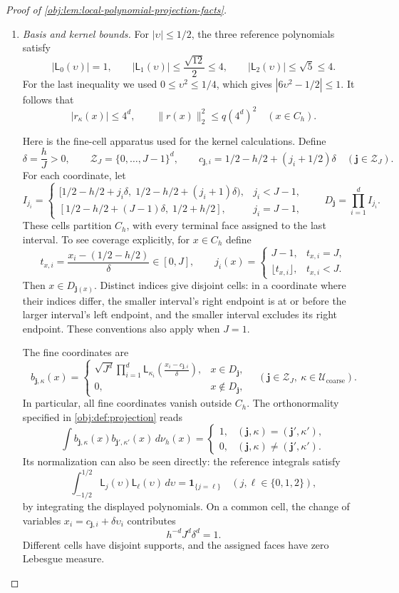 \begin{proof}[Proof of \cref{obj:lem:local-polynomial-projection-facts}]
\begin{enumerate}
\item \emph{Basis and kernel bounds.}
For \(|\upsilon|\le1/2\), the three reference polynomials satisfy
\[
|\mathsf L_0(\upsilon)|=1,\qquad
|\mathsf L_1(\upsilon)|\le\frac{\sqrt{12}}2\le4,\qquad
|\mathsf L_2(\upsilon)|\le\sqrt5\le4.
\]
For the last inequality we used
\(0\le\upsilon^2\le1/4\), which gives
\(|6\upsilon^2-1/2|\le1\). It follows that
\[
|r_\kappa(x)|\le4^d,
\qquad
\|r(x)\|_2^2\le q(4^d)^2
\quad(x\in C_h).
\]

Here is the fine-cell apparatus used for the kernel calculations.
Define
\[
\delta=\frac hJ>0,\qquad
\mathcal Z_J=\{0,\ldots,J-1\}^d,
\qquad
c_{\mathbf j,i}=1/2-h/2+(j_i+1/2)\delta
\quad(\mathbf j\in\mathcal Z_J).
\]
For each coordinate, let
\[
I_{j_i}=
\begin{cases}
[1/2-h/2+j_i\delta,\;1/2-h/2+(j_i+1)\delta),
 &j_i<J-1,\\
[1/2-h/2+(J-1)\delta,\;1/2+h/2],
 &j_i=J-1,
\end{cases}
\qquad
D_{\mathbf j}=\prod_{i=1}^d I_{j_i}.
\]
These cells partition \(C_h\), with every terminal face assigned to the
last interval. To see coverage explicitly, for \(x\in C_h\) define
\[
t_{x,i}=\frac{x_i-(1/2-h/2)}{\delta}\in[0,J],
\qquad
j_i(x)=
\begin{cases}
J-1,&t_{x,i}=J,\\
\lfloor t_{x,i}\rfloor,&t_{x,i}<J.
\end{cases}
\]
Then \(x\in D_{\mathbf j(x)}\). Distinct indices give disjoint cells:
in a coordinate where their indices differ, the smaller interval's right
endpoint is at or before the larger interval's left endpoint, and the
smaller interval excludes its right endpoint.
These conventions also apply when \(J=1\).

The fine coordinates are
\[
b_{\mathbf j,\kappa}(x)=
\begin{cases}
\displaystyle
\sqrt{J^d}\prod_{i=1}^d
 \mathsf L_{\kappa_i}\!\left(\frac{x_i-c_{\mathbf j,i}}{\delta}\right),
 &x\in D_{\mathbf j},\\
0,&x\notin D_{\mathbf j},
\end{cases}
\quad
(\mathbf j\in\mathcal Z_J,\ \kappa\in\mathcal U_{\mathrm{coarse}}).
\]
In particular, all fine coordinates vanish outside \(C_h\).
The orthonormality specified in \cref{obj:def:projection} reads
\[
\int b_{\mathbf j,\kappa}(x)b_{\mathbf j',\kappa'}(x)\,d\nu_h(x)
 =
\begin{cases}
1,&(\mathbf j,\kappa)=(\mathbf j',\kappa'),\\
0,&(\mathbf j,\kappa)\ne(\mathbf j',\kappa').
\end{cases}
\]
Its normalization can also be seen directly: the reference integrals satisfy
\[
\int_{-1/2}^{1/2}\mathsf L_j(\upsilon)\mathsf L_\ell(\upsilon)\,d\upsilon
 =\mathbf1_{\{j=\ell\}}
 \quad(j,\ell\in\{0,1,2\}),
\]
by integrating the displayed polynomials. On a common cell, the
change of variables \(x_i=c_{\mathbf j,i}+\delta\upsilon_i\) contributes
\[
h^{-d}J^d\delta^d=1.
\]
Different cells have disjoint supports, and the assigned faces have zero
Lebesgue measure.


\end{enumerate}
\end{proof}
